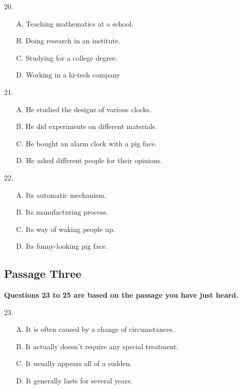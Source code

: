 \documentclass[UTF8,11pt]{ctexart}
\begin{document}
20.


\begin{itemize}[leftmargin=2em,itemsep=.2em,topsep=.4em]\item[A.] Teaching mathematics at a school.
\item[B.] Doing research in an institute.
\item[C.] Studying for a college degree.
\item[D.] Working in a hi-tech company
\end{itemize}

21.


\begin{itemize}[leftmargin=2em,itemsep=.2em,topsep=.4em]\item[A.] He studied the designs of various clocks.
\item[B.] He did experiments on different materials.
\item[C.] He bought an alarm clock with a pig face.
\item[D.] He asked different people for their opinions.
\end{itemize}

22.


\begin{itemize}[leftmargin=2em,itemsep=.2em,topsep=.4em]\item[A.] Its automatic mechanism.
\item[B.] Its manufacturing process.
\item[C.] Its way of waking people up.
\end{itemize}

\begin{itemize}[leftmargin=2em,itemsep=.2em,topsep=.4em]\item[D.] Its funny-looking pig face.
\end{itemize}

\subsection*{\textbf{Passage Three}}


\textbf{Questions 23 to 25 are based on the passage you have just heard.}


23.


\begin{itemize}[leftmargin=2em,itemsep=.2em,topsep=.4em]\item[A.] It is often caused by a change of circumstances.
\item[B.] It actually doesn't require any special treatment.
\item[C.] It usually appears all of a sudden.
\item[D.] It generally lasts for several years.
\end{itemize}
\end{document}
